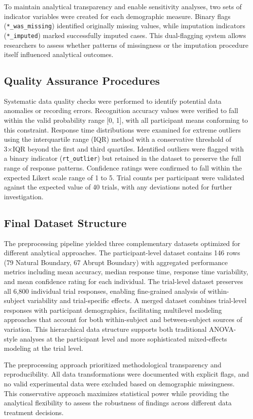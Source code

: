 To maintain analytical transparency and enable sensitivity analyses, two sets of indicator variables were created for each demographic measure. Binary flags (\texttt{*\_was\_missing}) identified originally missing values, while imputation indicators (\texttt{*\_imputed}) marked successfully imputed cases. This dual-flagging system allows researchers to assess whether patterns of missingness or the imputation procedure itself influenced analytical outcomes.

\subsection{Quality Assurance Procedures}

Systematic data quality checks were performed to identify potential data anomalies or recording errors. Recognition accuracy values were verified to fall within the valid probability range [0, 1], with all participant means conforming to this constraint. Response time distributions were examined for extreme outliers using the interquartile range (IQR) method with a conservative threshold of 3×IQR beyond the first and third quartiles. Identified outliers were flagged with a binary indicator (\texttt{rt\_outlier}) but retained in the dataset to preserve the full range of response patterns. Confidence ratings were confirmed to fall within the expected Likert scale range of 1 to 5. Trial counts per participant were validated against the expected value of 40 trials, with any deviations noted for further investigation.

\subsection{Final Dataset Structure}

The preprocessing pipeline yielded three complementary datasets optimized for different analytical approaches. The participant-level dataset contains 146 rows (79 Natural Boundary, 67 Abrupt Boundary) with aggregated performance metrics including mean accuracy, median response time, response time variability, and mean confidence rating for each individual. The trial-level dataset preserves all 6,800 individual trial responses, enabling fine-grained analysis of within-subject variability and trial-specific effects. A merged dataset combines trial-level responses with participant demographics, facilitating multilevel modeling approaches that account for both within-subject and between-subject sources of variation. This hierarchical data structure supports both traditional ANOVA-style analyses at the participant level and more sophisticated mixed-effects modeling at the trial level.

The preprocessing approach prioritized methodological transparency and reproducibility. All data transformations were documented with explicit flags, and no valid experimental data were excluded based on demographic missingness. This conservative approach maximizes statistical power while providing the analytical flexibility to assess the robustness of findings across different data treatment decisions.
